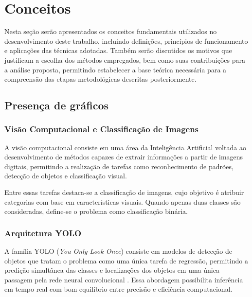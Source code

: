 \documentclass[a4paper,10pt, twocolumn]{article}
\begin{document}
\section{Conceitos}
Nesta seção serão apresentados os conceitos fundamentais utilizados no desenvolvimento deste trabalho, incluindo definições, princípios de funcionamento e aplicações das técnicas adotadas. Também serão discutidos os motivos que justificam a escolha dos métodos empregados, bem como suas contribuições para a análise proposta, permitindo estabelecer a base teórica necessária para a compreensão das etapas metodológicas descritas posteriormente.


\subsection{Presença de gráficos}

\subsubsection{Visão Computacional e Classificação de Imagens}

A visão computacional consiste em uma área da Inteligência Artificial
voltada ao desenvolvimento de métodos capazes de extrair informações a
partir de imagens digitais, permitindo a realização de tarefas como
reconhecimento de padrões, detecção de objetos e classificação visual.

Entre essas tarefas destaca-se a classificação de imagens, cujo objetivo é atribuir categorias com base em características visuais. Quando apenas duas classes são consideradas, define-se o problema como classificação binária.

\subsubsection{Arquitetura YOLO}

A família YOLO (\textit{You Only Look Once}) consiste em modelos de
detecção de objetos que tratam o problema como uma única tarefa de
regressão, permitindo a predição simultânea das classes e localizações
dos objetos em uma única passagem pela rede neural convolucional
\cite{redmon2016yolo}. Essa abordagem possibilita inferência em tempo
real com bom equilíbrio entre precisão e eficiência computacional.
\end{document}

